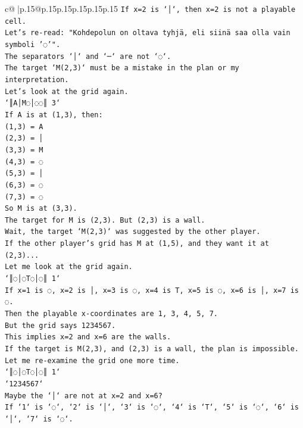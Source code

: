 \documentclass{article}
\begin{document}
{\begin{supertabular}{c@{$\;$}|p{.15\linewidth}@{}p{.15\linewidth}p{.15\linewidth}p{.15\linewidth}p{.15\linewidth}p{.15\linewidth}}
{{{\texttt{If x=2 is `│`, then x=2 is not a playable cell.} \\
\texttt{Let's re{-}read: "Kohdepolun on oltava tyhjä, eli siinä saa olla vain symboli '◌'".} \\
\texttt{The separators `│` and `─` are not `◌`.} \\
\texttt{The target `M(2,3)` must be a mistake in the plan or my interpretation.} \\
\texttt{Let's look at the grid again.} \\
\texttt{`║A│M◌│◌◌║ 3`} \\
\texttt{If A is at (1,3), then:} \\
\texttt{(1,3) = A} \\
\texttt{(2,3) = │} \\
\texttt{(3,3) = M} \\
\texttt{(4,3) = ◌} \\
\texttt{(5,3) = │} \\
\texttt{(6,3) = ◌} \\
\texttt{(7,3) = ◌} \\
\texttt{So M is at (3,3).} \\
\texttt{The target for M is (2,3). But (2,3) is a wall.} \\
\texttt{Wait, the target `M(2,3)` was suggested by the other player.} \\
\texttt{If the other player's grid has M at (1,5), and they want it at (2,3)...} \\
\texttt{Let me look at the grid again.} \\
\texttt{`║◌│◌T◌│◌║ 1`} \\
\texttt{If x=1 is ◌, x=2 is │, x=3 is ◌, x=4 is T, x=5 is ◌, x=6 is │, x=7 is ◌.} \\
\texttt{Then the playable x{-}coordinates are 1, 3, 4, 5, 7.} \\
\texttt{But the grid says 1234567.} \\
\texttt{This implies x=2 and x=6 are the walls.} \\
\texttt{If the target is M(2,3), and (2,3) is a wall, the plan is impossible.} \\
\texttt{Let me re{-}examine the grid one more time.} \\
\texttt{`║◌│◌T◌│◌║ 1`} \\
\texttt{`1234567`} \\
\texttt{Maybe the `│` are not at x=2 and x=6?} \\
\texttt{If `1` is `◌`, `2` is `│`, `3` is `◌`, `4` is `T`, `5` is `◌`, `6` is `│`, `7` is `◌`.} \\
}}}
\end{supertabular}}
\end{document}

